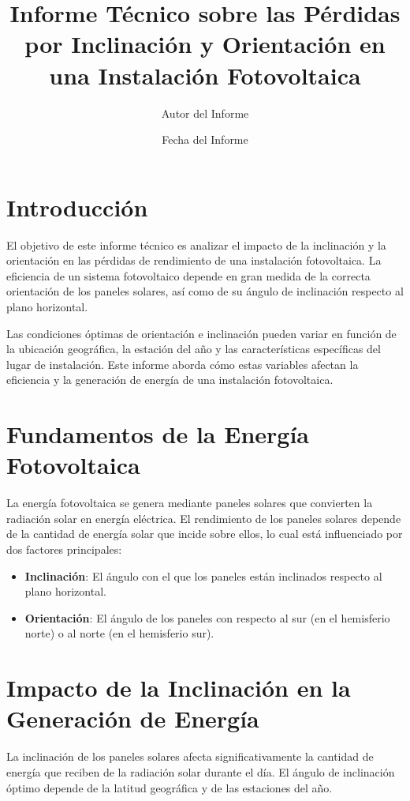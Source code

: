 \documentclass[a4paper,12pt]{article}
\title{Informe Técnico sobre las Pérdidas por Inclinación y Orientación en una Instalación Fotovoltaica}
\author{Autor del Informe}
\date{Fecha del Informe}
\begin{document}
\maketitle

\tableofcontents
\newpage

\section{Introducción}

El objetivo de este informe técnico es analizar el impacto de la inclinación y la orientación en las pérdidas de rendimiento de una instalación fotovoltaica. La eficiencia de un sistema fotovoltaico depende en gran medida de la correcta orientación de los paneles solares, así como de su ángulo de inclinación respecto al plano horizontal.

Las condiciones óptimas de orientación e inclinación pueden variar en función de la ubicación geográfica, la estación del año y las características específicas del lugar de instalación. Este informe aborda cómo estas variables afectan la eficiencia y la generación de energía de una instalación fotovoltaica.

\section{Fundamentos de la Energía Fotovoltaica}

La energía fotovoltaica se genera mediante paneles solares que convierten la radiación solar en energía eléctrica. El rendimiento de los paneles solares depende de la cantidad de energía solar que incide sobre ellos, lo cual está influenciado por dos factores principales:
\begin{itemize}
    \item \textbf{Inclinación}: El ángulo con el que los paneles están inclinados respecto al plano horizontal.
    \item \textbf{Orientación}: El ángulo de los paneles con respecto al sur (en el hemisferio norte) o al norte (en el hemisferio sur).
\end{itemize}

\section{Impacto de la Inclinación en la Generación de Energía}

La inclinación de los paneles solares afecta significativamente la cantidad de energía que reciben de la radiación solar durante el día. El ángulo de inclinación óptimo depende de la latitud geográfica y de las estaciones del año.
\end{document}
